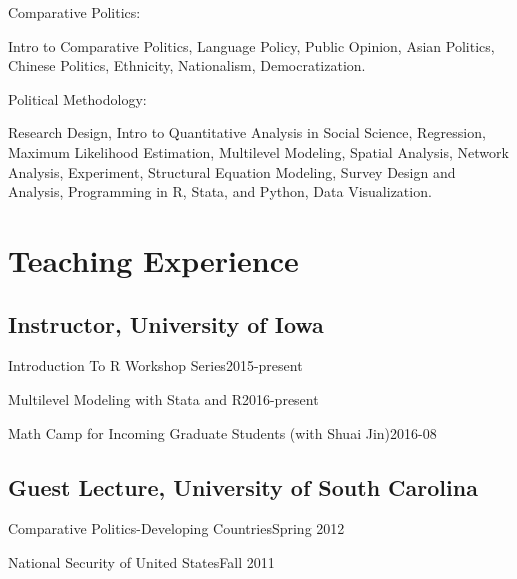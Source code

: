 \documentclass[10.5pt,]{article}
\providecommand{\tightlist}{%
  \setlength{\itemsep}{0pt}\setlength{\parskip}{0pt}}
\renewenvironment{itemize}{
  \begin{list}{}{
    \setlength{\leftmargin}{1.5em}
  }
}{
  \end{list}
}
\begin{document}
\begin{itemize}
\tightlist
\item
  Comparative Politics:

  \begin{itemize}
  \tightlist
  \item
    Intro to Comparative Politics, Language Policy, Public Opinion,
    Asian Politics, Chinese Politics, Ethnicity, Nationalism,
    Democratization.
  \end{itemize}
\item
  Political Methodology:

  \begin{itemize}
  \tightlist
  \item
    Research Design, Intro to Quantitative Analysis in Social Science,
    Regression, Maximum Likelihood Estimation, Multilevel Modeling,
    Spatial Analysis, Network Analysis, Experiment, Structural Equation
    Modeling, Survey Design and Analysis, Programming in R, Stata, and
    Python, Data Visualization.
  \end{itemize}
\end{itemize}

\section{Teaching Experience}\label{teaching-experience}

\subsection{Instructor, University of
Iowa}\label{instructor-university-of-iowa}

\begin{itemize}
\tightlist
\item
  Introduction To R Workshop Series\hfill 2015-present
\item
  Multilevel Modeling with Stata and R\hfill 2016-present
\item
  Math Camp for Incoming Graduate Students (with Shuai
  Jin)\hfill 2016-08
\end{itemize}

\subsection{Guest Lecture, University of South
Carolina}\label{guest-lecture-university-of-south-carolina}

\begin{itemize}
\tightlist
\item
  Comparative Politics-Developing Countries\hfill Spring 2012
\item
  National Security of United States\hfill Fall 2011
\end{itemize}
\end{document}
